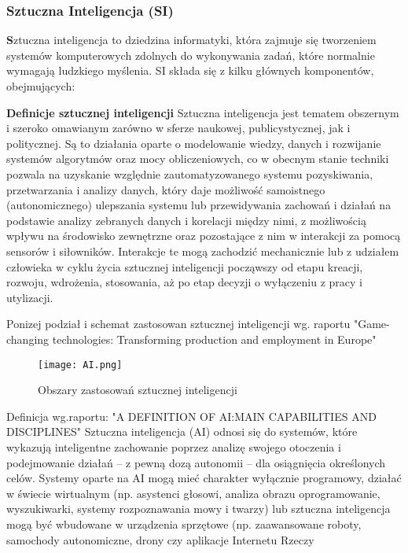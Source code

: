 \subsubsection{Sztuczna Inteligencja (SI)}
\textbf
Sztuczna inteligencja to dziedzina informatyki, która zajmuje się tworzeniem systemów komputerowych zdolnych do wykonywania zadań, które normalnie wymagają ludzkiego myślenia. SI składa się z kilku głównych komponentów, obejmujących:

\textbf {Definicje sztucznej inteligencji}
Sztuczna inteligencja jest tematem obszernym i szeroko omawianym zarówno w sferze naukowej, publicystycznej, jak i politycznej. Są to działania oparte o modelowanie wiedzy, danych i rozwijanie systemów algorytmów oraz mocy obliczeniowych, co w obecnym stanie techniki pozwala na uzyskanie względnie zautomatyzowanego systemu pozyskiwania, przetwarzania i analizy danych, który daje możliwość samoistnego (autonomicznego) ulepszania systemu lub przewidywania zachowań i działań na podstawie analizy zebranych danych i korelacji między nimi, z możliwością wpływu na środowisko zewnętrzne oraz pozostające z nim w interakcji za pomocą sensorów i siłowników. Interakcje te mogą zachodzić mechanicznie lub z udziałem człowieka w cyklu życia sztucznej inteligencji począwszy od etapu kreacji, rozwoju, wdrożenia, stosowania, aż po etap decyzji o wyłączeniu z pracy i utylizacji.\cite{gov2023}


Ponizej podział i schemat zastosowan sztucznej inteligencji wg. raportu "Game-changing technologies: Transforming production and employment in Europe"
\begin{figure}[!h]
    \label{fig:ai}
    \centering \texttt{[image: AI.png]}
    \caption{Obszary zastosowań  sztucznej inteligencji\cite{gov2023}}
\end{figure}

Definicja wg.raportu: "A DEFINITION OF AI:MAIN CAPABILITIES AND DISCIPLINES"  
Sztuczna inteligencja (AI) odnosi się do systemów, które wykazują inteligentne zachowanie poprzez analizę swojego otoczenia i
podejmowanie działań – z pewną dozą autonomii – dla osiągnięcia określonych celów.
Systemy oparte na AI mogą mieć charakter wyłącznie programowy, działać w świecie wirtualnym (np. asystenci głosowi, analiza obrazu
oprogramowanie, wyszukiwarki, systemy rozpoznawania mowy i twarzy) lub sztuczna inteligencja mogą być wbudowane w urządzenia sprzętowe (np.
zaawansowane roboty, samochody autonomiczne, drony czy aplikacje Internetu Rzeczy\cite{ec2029}



